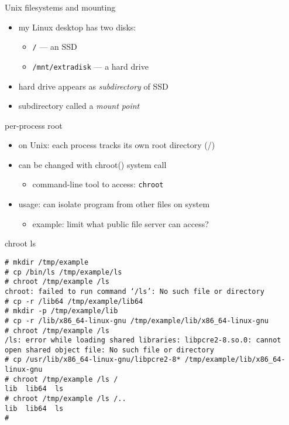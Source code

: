 \begin{frame}{Unix filesystems and mounting}
    \begin{itemize}
    \item my Linux desktop has two disks:
        \begin{itemize}
        \item \texttt{/} --- an SSD
        \item \texttt{/mnt/extradisk} --- a hard drive
        \end{itemize}
    \item hard drive appears as \textit{subdirectory} of SSD
    \item subdirectory called a \textit{mount point}
    \end{itemize}
\end{frame}

\begin{frame}[fragile,label=perProcessRoot]{per-process root}
    \begin{itemize}
    \item on Unix: each process tracks its own root directory (/)
    \item can be changed with chroot() system call
        \begin{itemize}
        \item command-line tool to access: \texttt{chroot}
        \end{itemize}
    \vspace{.5cm}
    \item usage: can isolate program from other files on system
        \begin{itemize}
        \item example: limit what public file server can access?
        \end{itemize}
    \end{itemize}
\end{frame}


\begin{frame}[fragile,label=lsChrootExample]{chroot ls}
\begin{lstlisting}[language={},style=smaller]
# mkdir /tmp/example
# cp /bin/ls /tmp/example/ls
# chroot /tmp/example /ls
chroot: failed to run command ‘/ls’: No such file or directory
# cp -r /lib64 /tmp/example/lib64
# mkdir -p /tmp/example/lib
# cp -r /lib/x86_64-linux-gnu /tmp/example/lib/x86_64-linux-gnu
# chroot /tmp/example /ls
/ls: error while loading shared libraries: libpcre2-8.so.0: cannot open shared object file: No such file or directory
# cp /usr/lib/x86_64-linux-gnu/libpcre2-8* /tmp/example/lib/x86_64-linux-gnu
# chroot /tmp/example /ls /
lib  lib64  ls
# chroot /tmp/example /ls /..
lib  lib64  ls
# 
\end{lstlisting}
\end{frame}

